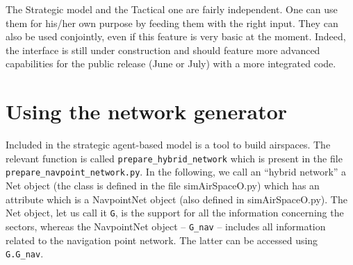 \documentclass[12pt]{article}
\begin{document}
The Strategic model and the Tactical one are fairly independent. One can use them for his/her own purpose by feeding them with the right input. They can also be used conjointly, even if this feature is very basic at the moment. Indeed, the interface is still under construction and should feature more advanced capabilities for the public release (June or July) with a more integrated code.

\section{Using the network generator}
\label{sec:network}

Included in the strategic agent-based model is a tool to build airspaces. The relevant function is called \verb|prepare_hybrid_network| which is present in the file \verb|prepare_navpoint_network.py|. In the following, we call an ``hybrid network'' a Net object (the class is defined in the file simAirSpaceO.py) which has an attribute which is a NavpointNet object (also defined in simAirSpaceO.py). The Net object, let us call it \verb|G|, is the support for all the information concerning the sectors, whereas the NavpointNet object -- \verb|G_nav| -- includes all information related to the navigation point network. The latter can be accessed using \verb|G.G_nav|.
\end{document}
